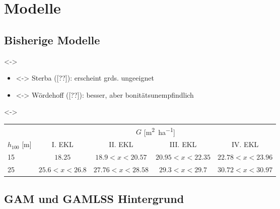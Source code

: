 \section{Modelle}

\subsection{Bisherige Modelle}
\begin{frame}[c]
  \visible<\theFirstElement->{
    \begin{itemize}
    \item<\theFirstElement-> Sterba ([??]): erscheint grds. ungeeignet
    \item<\theSecondElement-> Wördehoff ([??]): besser, aber bonitätsunempfindlich
    \end{itemize}}

  \visible<\theSecondElement->{
    \begin{center}
      \begin{minipage}[t]{0.975\linewidth}
        {\scriptsize
        \begin{tabular}{l c c c c}
          \toprule
          & \multicolumn{4}{c}{\(G\) [\si{\square\meter\per\hectare}]} \\ \cline{2-5}
          \(h_{100}\) [\si{\meter}] & I. EKL & II. EKL & III. EKL & IV. EKL \\
          \midrule
          15 & \(18.25\) & \(18.9 < x < 20.57\) & \(20.95 < x < 22.35\) & \(22.78 < x < 23.96\) \\
          25 & \(25.6 < x < 26.8\) & \(27.76 < x < 28.58\) & \(29.3 < x < 29.7\) & \(30.72 < x < 30.97\) \\
          \bottomrule
        \end{tabular}}
      \end{minipage}
    \end{center}}
\end{frame}

\subsection{GAM und GAMLSS \textendash{} Hintergrund}

